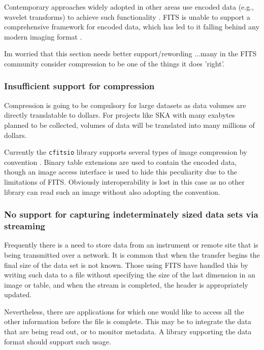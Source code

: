 \documentclass[final,authoryear,5p,times,twocolumn]{elsarticle}
\begin{document}
{{Contemporary approaches widely adopted in other areas use encoded data
(e.g., wavelet transforms) to achieve such functionality \citep{2003SPIE.5150..791T}. FITS is unable to support
a comprehensive framework for encoded data, which has led to it
falling behind any modern imaging format \citep[see e.g.,][]{2013arXiv1307.5123K}.

{\color{red} Im worried that this section needs better support/rewording
...many in the FITS community consider compression to be one of the things it 
does 'right'. 

\subsubsection{Insufficient support for compression}

Compression is going to be compulsory for large datasets as data volumes
are directly translatable to dollars. For projects like SKA with many
exabytes planned to be collected, volumes of data will be translated into
many millions of dollars.

Currently the \texttt{cfitsio} library supports several types of image
compression by convention \citep[see
e.g.,][\href{http://ascl.net/1010.002}{ascl:1010.002}]{2000ASPC..216..551P,2007ASPC..376..483S,2009PASP..121..414P}.
Binary table extensions are used to contain the encoded data, though an
image access interface is used to hide this peculiarity due to the
limitations of FITS. Obviously interoperability is lost in this case as
no other library can read such an image without also adopting the
convention.
}

\subsubsection{No support for capturing indeterminately sized data sets via streaming}


Frequently there is a need to store data from an instrument or remote
site that is being transmitted over a network. It is common that when
the transfer begins the final size of the data set is not known. Those
using FITS have handled this by writing such data to a file without
specifying the size of the last dimension in an image or table, and
when the stream is completed, the header is appropriately updated.


Nevertheless, there are applications for which one would like to
access all the other information before the file is complete. This may
be to integrate the data that are being read out, or to monitor
metadata. A library supporting the data format should support such
usage.


}}
\end{document}
